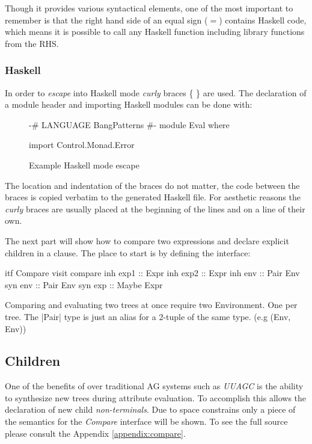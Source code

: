 Though it provides various syntactical elements, one of the most important to remember is that the right hand side of an equal sign ($=$) contains Haskell code, which means it is possible to call any Haskell function including library functions from the RHS. 

\subsubsection{Haskell}
In order to \emph{escape} into Haskell mode \emph{curly} braces \{ \} are used. The declaration of a module header and importing Haskell modules can be done with:

\begin{figure}[!h]
\begin{code}
{
{-# LANGUAGE BangPatterns #-}
module Eval where

import Control.Monad.Error
}
\end{code}
\caption{Example Haskell mode escape}
\end{figure}

The location and indentation of the braces do not matter, the code between the braces is copied verbatim to the generated Haskell file. For aesthetic reasons the \emph{curly} braces are usually placed at the beginning of the lines and on a line of their own. 

The next part will show how to compare two expressions and declare  explicit children in a clause. The place to start is by defining the interface:

\begin{code}
itf Compare
  visit compare
    inh exp1  :: Expr
    inh exp2  :: Expr
    inh env   :: Pair Env
    syn env   :: Pair Env
    syn exp   :: Maybe Expr
\end{code}
Comparing and evaluating two trees at once require two Environment. One per tree. The |Pair| type is just an alias for a 2-tuple of the same type. (e.g  (Env, Env))

\subsection{Children}
One of the benefits of \rcore over traditional AG systems such as \emph{UUAGC} is the ability to synthesize new trees during attribute evaluation. To accomplish this \rcore allows the declaration of new child \emph{non-terminals}. Due to space constrains only a piece of the semantics for the \emph{Compare} interface will be shown. To see the full source please consult the Appendix \ref{appendix:compare}.

